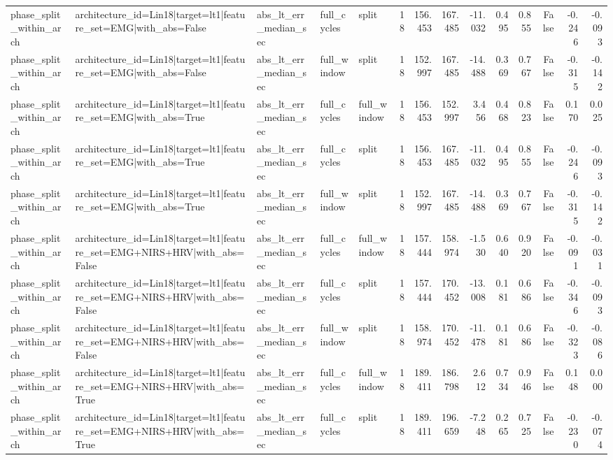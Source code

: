 \begin{table}
\begin{tabular}{lllllrrrrrrrrr}
phase_split_within_arch & architecture_id=Lin18|target=lt1|feature_set=EMG|with_abs=False & abs_lt_err_median_sec & full_cycles & split & 18 & 156.453 & 167.485 & -11.032 & 0.495 & 0.855 & False & -0.246 & -0.093 \\
phase_split_within_arch & architecture_id=Lin18|target=lt1|feature_set=EMG|with_abs=False & abs_lt_err_median_sec & full_window & split & 18 & 152.997 & 167.485 & -14.488 & 0.369 & 0.767 & False & -0.315 & -0.142 \\
phase_split_within_arch & architecture_id=Lin18|target=lt1|feature_set=EMG|with_abs=True & abs_lt_err_median_sec & full_cycles & full_window & 18 & 156.453 & 152.997 & 3.456 & 0.468 & 0.823 & False & 0.170 & 0.025 \\
phase_split_within_arch & architecture_id=Lin18|target=lt1|feature_set=EMG|with_abs=True & abs_lt_err_median_sec & full_cycles & split & 18 & 156.453 & 167.485 & -11.032 & 0.495 & 0.855 & False & -0.246 & -0.093 \\
phase_split_within_arch & architecture_id=Lin18|target=lt1|feature_set=EMG|with_abs=True & abs_lt_err_median_sec & full_window & split & 18 & 152.997 & 167.485 & -14.488 & 0.369 & 0.767 & False & -0.315 & -0.142 \\
phase_split_within_arch & architecture_id=Lin18|target=lt1|feature_set=EMG+NIRS+HRV|with_abs=False & abs_lt_err_median_sec & full_cycles & full_window & 18 & 157.444 & 158.974 & -1.530 & 0.640 & 0.920 & False & -0.091 & -0.031 \\
phase_split_within_arch & architecture_id=Lin18|target=lt1|feature_set=EMG+NIRS+HRV|with_abs=False & abs_lt_err_median_sec & full_cycles & split & 18 & 157.444 & 170.452 & -13.008 & 0.181 & 0.686 & False & -0.346 & -0.093 \\
phase_split_within_arch & architecture_id=Lin18|target=lt1|feature_set=EMG+NIRS+HRV|with_abs=False & abs_lt_err_median_sec & full_window & split & 18 & 158.974 & 170.452 & -11.478 & 0.181 & 0.686 & False & -0.323 & -0.086 \\
phase_split_within_arch & architecture_id=Lin18|target=lt1|feature_set=EMG+NIRS+HRV|with_abs=True & abs_lt_err_median_sec & full_cycles & full_window & 18 & 189.411 & 186.798 & 2.612 & 0.734 & 0.946 & False & 0.148 & 0.000 \\
phase_split_within_arch & architecture_id=Lin18|target=lt1|feature_set=EMG+NIRS+HRV|with_abs=True & abs_lt_err_median_sec & full_cycles & split & 18 & 189.411 & 196.659 & -7.248 & 0.265 & 0.725 & False & -0.230 & -0.074 \\

\end{tabular}
\end{table}

